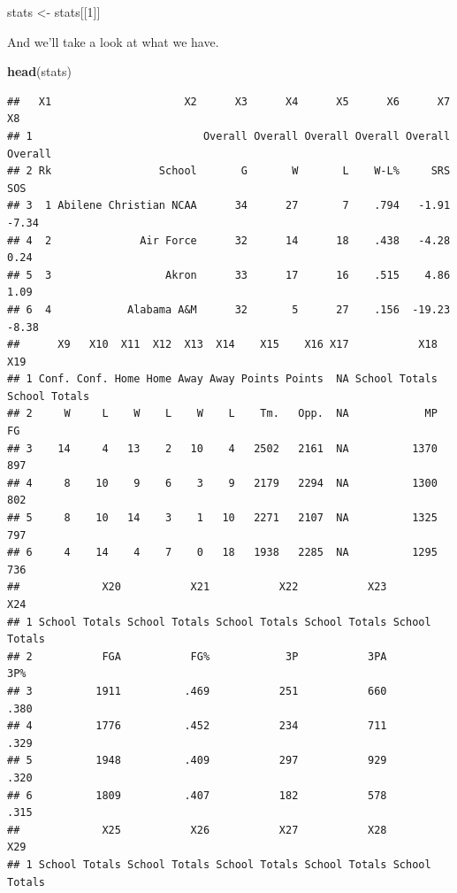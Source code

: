 \documentclass[]{book}
\newenvironment{Shaded}{\begin{snugshade}}{\end{snugshade}}
\newcommand{\DecValTok}[1]{\textcolor[rgb]{0.00,0.00,0.81}{#1}}
\newcommand{\KeywordTok}[1]{\textcolor[rgb]{0.13,0.29,0.53}{\textbf{#1}}}
\newcommand{\NormalTok}[1]{#1}
\newcommand{\StringTok}[1]{\textcolor[rgb]{0.31,0.60,0.02}{#1}}
\begin{document}
\begin{Shaded}
\begin{Highlighting}[]
\NormalTok{stats <-}\StringTok{ }\NormalTok{stats[[}\DecValTok{1}\NormalTok{]]}
\end{Highlighting}
\end{Shaded}

And we'll take a look at what we have.

\begin{Shaded}
\begin{Highlighting}[]
\KeywordTok{head}\NormalTok{(stats)}
\end{Highlighting}
\end{Shaded}

\begin{verbatim}
##   X1                     X2      X3      X4      X5      X6      X7      X8
## 1                           Overall Overall Overall Overall Overall Overall
## 2 Rk                 School       G       W       L    W-L%     SRS     SOS
## 3  1 Abilene Christian NCAA      34      27       7    .794   -1.91   -7.34
## 4  2              Air Force      32      14      18    .438   -4.28    0.24
## 5  3                  Akron      33      17      16    .515    4.86    1.09
## 6  4            Alabama A&M      32       5      27    .156  -19.23   -8.38
##      X9   X10  X11  X12  X13  X14    X15    X16 X17           X18           X19
## 1 Conf. Conf. Home Home Away Away Points Points  NA School Totals School Totals
## 2     W     L    W    L    W    L    Tm.   Opp.  NA            MP            FG
## 3    14     4   13    2   10    4   2502   2161  NA          1370           897
## 4     8    10    9    6    3    9   2179   2294  NA          1300           802
## 5     8    10   14    3    1   10   2271   2107  NA          1325           797
## 6     4    14    4    7    0   18   1938   2285  NA          1295           736
##             X20           X21           X22           X23           X24
## 1 School Totals School Totals School Totals School Totals School Totals
## 2           FGA           FG%            3P           3PA           3P%
## 3          1911          .469           251           660          .380
## 4          1776          .452           234           711          .329
## 5          1948          .409           297           929          .320
## 6          1809          .407           182           578          .315
##             X25           X26           X27           X28           X29
## 1 School Totals School Totals School Totals School Totals School Totals

\end{verbatim}
\end{document}
